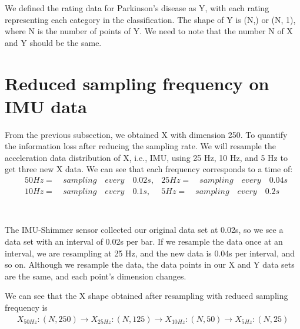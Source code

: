 We defined the rating data for Parkinson's disease as Y, with each rating representing each category in the classification. The shape of Y is (N,) or (N, 1), where N is the number of points of Y. We need to note that the number N of X and Y should be the same.

\section{Reduced sampling frequency on IMU data}
From the previous subsection, we obtained X with dimension 250. To quantify the information loss after reducing the sampling rate. We will resample the acceleration data distribution of X, i.e., IMU, using 25 Hz, 10 Hz, and 5 Hz to get three new X data. We can see that each frequency corresponds to a time of:
\begin{equation}\nonumber
\begin{aligned}
&50Hz = \quad sampling\quad every\quad 0.02s,  &25Hz =\quad sampling\quad every\quad 0.04s  \\
&10Hz = \quad sampling\quad every\quad0.1s,   &5Hz =\quad sampling\quad every\quad 0.2s \\
\end{aligned}
\end{equation}
\\ \hspace*{\fill} \\
The IMU-Shimmer sensor collected our original data set at 0.02s, so we see a data set with an interval of 0.02s per bar. If we resample the data once at an interval, we are resampling at 25 Hz, and the new data is 0.04s per interval, and so on. Although we resample the data, the data points in our X and Y data sets are the same, and each point's dimension changes.


We can see that the X shape obtained after resampling with reduced sampling frequency is
\begin{equation}\nonumber
\begin{aligned}
X_{50Hz}:(N,250) \to  X_{25Hz}: (N,125) \to X_{10Hz}:(N,50) \to X_{5Hz}:(N,25) 
\end{aligned}
\end{equation}







